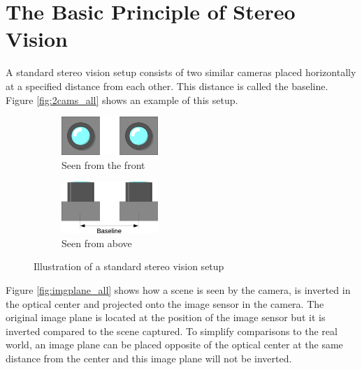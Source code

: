 \section{The Basic Principle of Stereo Vision}\label{sec:basicstereo}
A standard stereo vision setup consists of two similar cameras placed horizontally at a specified distance from each other. This distance is called the baseline. Figure \vref{fig:2cams_all} shows an example of this setup.\\
\begin{figure}[ht!]
  \centering
  \begin{subfigure}[t]{1\textwidth}
    \centering\includegraphics[width=0.4\textwidth]{figures/2cams_fro}
    \caption{Seen from the front\label{fig:2cams_fro}}
  \end{subfigure}\vspace{0.4cm}
  \begin{subfigure}[t]{1\textwidth}
    \centering\includegraphics[width=0.4\textwidth]{figures/2cams_top}
    \caption{Seen from above\label{fig:2cams_top}}
  \end{subfigure}
  \caption{Illustration of a standard stereo vision setup\label{fig:2cams_all}}
\end{figure}

Figure \vref{fig:imgplane_all} shows how a scene is seen by the camera, is inverted in the optical center and projected onto the image sensor in the camera. The original image plane is located at the position of the image sensor but it is inverted compared to the scene captured. To simplify comparisons to the real world, an image plane can be placed opposite of the optical center at the same distance from the center and this image plane will not be inverted.

